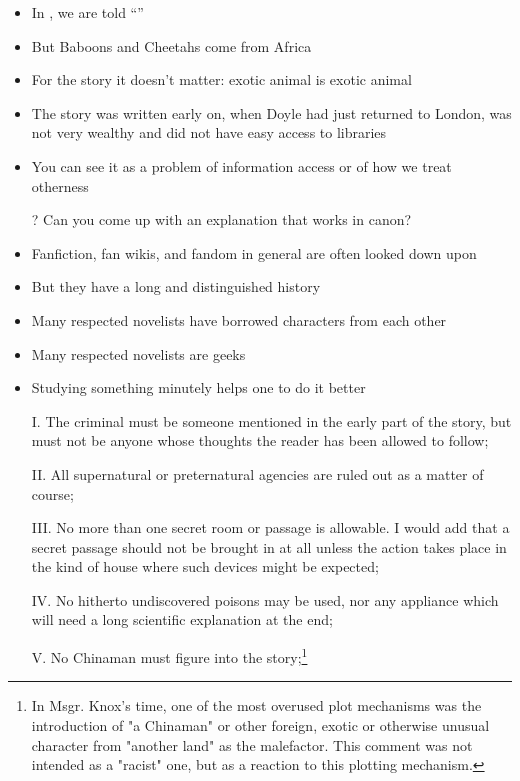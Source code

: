 \documentclass[a4paper,landscape,headrule,footrule,xetex]{foils}
\begin{document}
\begin{itemize}
\item In ,  we are told ``''
\item But Baboons and Cheetahs come from Africa
\item For the story it doesn't matter: exotic animal is exotic animal
\item The story was written early on, when Doyle had just returned to
  London, was not very wealthy and did not have easy access to
  libraries
\item You can see it as a problem of information access or of how we
  treat otherness
\item[?] Can you come up with an explanation that works in canon? \task


\end{itemize}


\begin{itemize}
\item Fanfiction, fan wikis, and fandom in general are often looked down upon
\item But they have a long and distinguished history
\item Many respected novelists have borrowed characters from each other
\item Many respected novelists are geeks
\item Studying something minutely helps one to do it better
\end{itemize}




\begin{itemize}   %
\item[I.]     The criminal must be someone mentioned in the early part of the story, but must not be anyone whose thoughts the reader has been allowed to follow;
\item[II.]    All supernatural or preternatural agencies are ruled out as a matter of course;
\item[III.]   No more than one secret room or passage is allowable.  I would add that a secret passage should not be brought in at all unless the action takes place in the kind of house where such devices might be expected;
\item[IV.]   No hitherto undiscovered poisons may be used, nor any appliance which will need a long scientific explanation at the end;
\item[V.]    No Chinaman must figure into the story;\footnote{In Msgr. Knox's time, one of the most overused plot mechanisms was the introduction of "a Chinaman" or other foreign, exotic or otherwise unusual character from "another land" as the malefactor.  This comment was not intended as a "racist" one, but as a reaction to this plotting mechanism.}
\end{itemize}
\newpage
\end{document}
